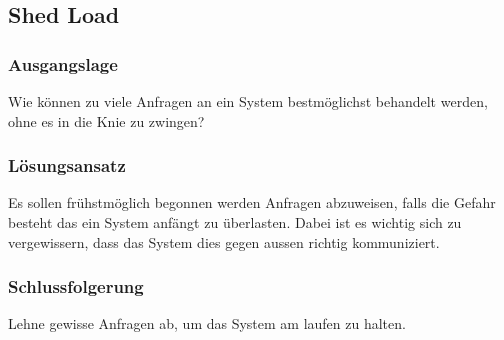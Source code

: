 \subsection{Shed Load}

\subsubsection*{Ausgangslage}

Wie können zu viele Anfragen an ein System bestmöglichst behandelt werden, ohne es in die Knie zu zwingen?

\subsubsection*{Lösungsansatz}

Es sollen frühstmöglich begonnen werden Anfragen abzuweisen, falls die Gefahr besteht das ein System anfängt zu überlasten. Dabei ist es wichtig sich zu vergewissern, dass das System dies gegen aussen richtig kommuniziert.

\subsubsection*{Schlussfolgerung}

Lehne gewisse Anfragen ab, um das System am laufen zu halten.

